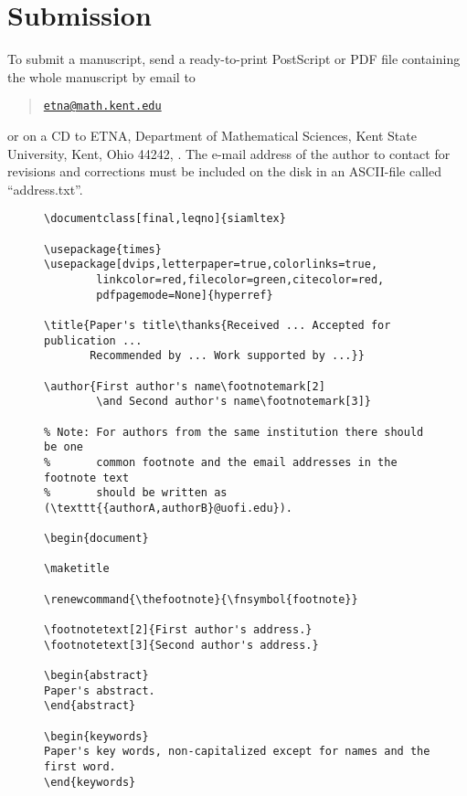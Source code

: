 \documentclass{scrartcl}
\begin{document}

\section{Submission}
To submit a manuscript, send a ready-to-print PostScript or PDF file containing
the whole manuscript by email to
\begin{quote}
    \href{mailto:etna@math.kent.edu}{\nolinkurl{etna@math.kent.edu}}
\end{quote}
or on a CD to ETNA, Department of Mathematical Sciences, Kent State University,
Kent, Ohio 44242, \@USA. The e-mail address of the author to contact for
revisions and corrections must be included on the disk in an ASCII-file called
``address.txt''.



\newpage
\begin{figure}
\begin{verbatim}
\documentclass[final,leqno]{siamltex}

\usepackage{times}
\usepackage[dvips,letterpaper=true,colorlinks=true,
        linkcolor=red,filecolor=green,citecolor=red,
        pdfpagemode=None]{hyperref}

\title{Paper's title\thanks{Received ... Accepted for publication ...
       Recommended by ... Work supported by ...}}

\author{First author's name\footnotemark[2]
        \and Second author's name\footnotemark[3]}

% Note: For authors from the same institution there should be one
%       common footnote and the email addresses in the footnote text
%       should be written as (\texttt{{authorA,authorB}@uofi.edu}).

\begin{document}

\maketitle

\renewcommand{\thefootnote}{\fnsymbol{footnote}}

\footnotetext[2]{First author's address.}
\footnotetext[3]{Second author's address.}

\begin{abstract}
Paper's abstract.
\end{abstract}

\begin{keywords}
Paper's key words, non-capitalized except for names and the first word.
\end{keywords}


\end{verbatim}
\end{figure}
\end{document}
